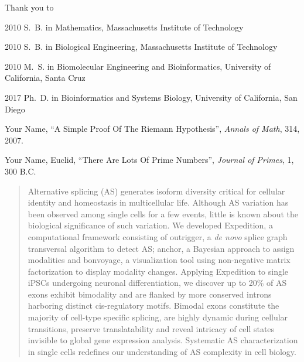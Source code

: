 \begin{frontmatter}
%
%
\begin{acknowledgements}
 Thank you to 
\end{acknowledgements}


%
%
\begin{vitapage}
\begin{vita}
  \item[2010] S.~B. in Mathematics, Massachusetts Institute of Technology
  \item[2010] S.~B. in Biological Engineering, Massachusetts Institute of Technology
  \item[2010] M.~S. in Biomolecular Engineering and Bioinformatics, University of California, Santa Cruz
  \item[2017] Ph.~D. in Bioinformatics and Systems Biology, University of California, San Diego
\end{vita}
\begin{publications}
  \item Your Name, ``A Simple Proof Of The Riemann Hypothesis'', \emph{Annals of Math}, 314, 2007.
  \item Your Name, Euclid, ``There Are Lots Of Prime Numbers'', \emph{Journal of Primes}, 1, 300 B.C.
\end{publications}
\end{vitapage}


%
%
\begin{abstract}
  Alternative splicing (AS) generates isoform diversity critical for cellular identity and homeostasis in multicellular life. Although AS variation has been observed among single cells for a few events, little is known about the biological significance of such variation. We developed Expedition, a computational framework consisting of outrigger, a \emph{de novo} splice graph transversal algorithm to detect AS; anchor, a Bayesian approach to assign modalities and bonvoyage, a visualization tool using non-negative matrix factorization to display modality changes. Applying Expedition to single iPSCs undergoing neuronal differentiation, we discover up to 20\% of AS exons exhibit bimodality and are flanked by more conserved introns harboring distinct cis-regulatory motifs. Bimodal exons constitute the majority of cell-type specific splicing, are highly dynamic during cellular transitions, preserve translatability and reveal intricacy of cell states invisible to global gene expression analysis. Systematic AS characterization in single cells redefines our understanding of AS complexity in cell biology.

\end{abstract}


\end{frontmatter}
